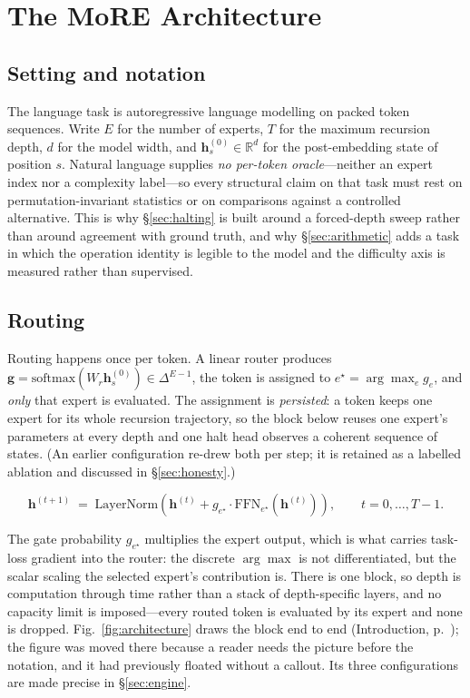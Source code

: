 \section{The MoRE Architecture}
\label{sec:method}

\subsection{Setting and notation}

The language task is autoregressive language modelling on packed token sequences.
Write
$E$ for the number of experts, $T$ for the maximum recursion depth, $d$ for the
model width, and $\mathbf{h}^{(0)}_s \in \mathbb{R}^{d}$ for the post-embedding
state of position $s$. Natural language supplies \emph{no per-token
oracle}---neither an expert index nor a complexity label---so every structural
claim on that task must rest on permutation-invariant statistics or on
comparisons against a controlled alternative. This is why
\S\ref{sec:halting} is built around a forced-depth sweep rather than around
agreement with ground truth, and why \S\ref{sec:arithmetic} adds a task in which
the operation identity is legible to the model and the difficulty axis is
measured rather than supervised.

\subsection{Routing}

Routing happens once per token. A linear router produces
$\mathbf{g} = \mathrm{softmax}(W_r \mathbf{h}^{(0)}_s) \in \Delta^{E-1}$, the
token is assigned to $e^\star = \arg\max_e g_e$, and \emph{only} that expert is
evaluated. The assignment is \emph{persisted}: a token keeps one expert for its
whole recursion trajectory, so the block below reuses one expert's parameters at
every depth and one halt head observes a coherent sequence of states. (An earlier
configuration re-drew both per step; it is retained as a labelled ablation and
discussed in \S\ref{sec:honesty}.)

{\dispsize
\begin{equation}
\mathbf{h}^{(t+1)} \;=\; \mathrm{LayerNorm}\!\left(
  \mathbf{h}^{(t)} + g_{e^\star}\cdot \mathrm{FFN}_{e^\star}\!\left(\mathbf{h}^{(t)}\right)
\right), \qquad t = 0,\dots,T-1 .
\label{eq:block}
\end{equation}
}

The gate probability $g_{e^\star}$ multiplies the expert output, which is what
carries task-loss gradient into the router: the discrete $\arg\max$ is not
differentiated, but the scalar scaling the selected expert's contribution is.
There is one block, so depth is computation through time rather than a stack of
depth-specific layers, and no capacity limit is imposed---every routed token is
evaluated by its expert and none is dropped. Fig.~\ref{fig:architecture} draws
the block end to end (Introduction, p.~\pageref{fig:architecture}); the figure
was moved there because a reader needs the picture before the notation, and it
had previously floated without a callout. Its three configurations are made
precise in \S\ref{sec:engine}.

